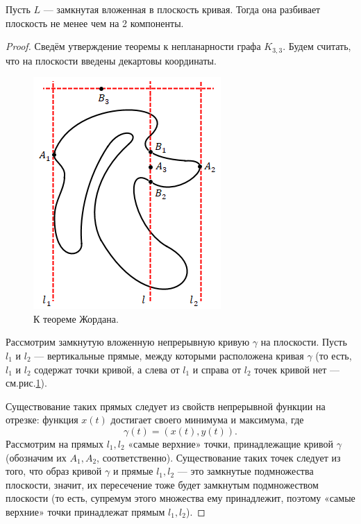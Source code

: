 \begin{theorem}
    Пусть $L$ — замкнутая вложенная в плоскость кривая. Тогда она разбивает плоскость не менее чем на 2 компоненты.
\end{theorem}
\begin{proof}
    Сведём утверждение теоремы к непланарности графа $K_{3,3}$. Будем считать, что на плоскости введены декартовы координаты.
    \begin{figure}[h]
        \centering
        \includegraphics[scale=0.8]{images/c5.3.png}
        \caption{К теореме Жордана.}
        \label{fig:c5.3}
    \end{figure}
    Рассмотрим замкнутую вложенную непрерывную кривую $\gamma$ на плоскости. Пусть $l_1$ и $l_2$ — вертикальные прямые, между которыми расположена кривая $\gamma$ (то есть, $l_1$ и $l_2$ содержат точки кривой, а слева от $l_1$ и справа от $l_2$ точек кривой нет — см.рис.\ref{fig:c5.3}).

    Существование таких прямых следует из свойств непрерывной функции на отрезке: функция $x(t)$ достигает своего минимума и максимума, где \[\gamma(t) = \left(x(t), y(t)\right).\]
    Рассмотрим на прямых $l_1, l_2$ «самые верхние» точки, принадлежащие кривой $\gamma$ (обозначим их $A_1, A_2$, соответственно). Существование таких точек следует из того, что образ кривой $\gamma$ и прямые $l_1, l_2$ — это замкнутые подмножества плоскости, значит, их пересечение тоже будет замкнутым подмножеством плоскости (то есть, супремум этого множества ему принадлежит, поэтому «самые верхние» точки принадлежат прямым $l_1, l_2$).


\end{proof}
